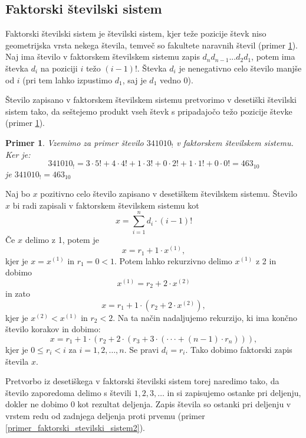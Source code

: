 \documentclass[a4paper, 12pt]{book}
\newtheorem{primer}{Primer}[chapter]
\begin{document}
\subsection{ Faktorski številski sistem }

Faktorski številski sistem je številski sistem, kjer teže pozicije števk niso geometrijska vrsta nekega števila, temveč so fakultete naravnih števil (primer \ref{primer_faktorski_stevilski_sistem1}). Naj ima število v faktorskem številskem sistemu zapis $d_nd_{n-1}...d_2d_1$, potem ima števka $d_i$ na poziciji $i$ težo $(i-1)!$. Števka $d_i$ je nenegativno celo število manjše od $i$ (pri tem lahko izpustimo $d_1$, saj je $d_1$ vedno $0$). 

Število zapisano v faktorskem številskem sistemu pretvorimo v desetiški številski sistem tako, da seštejemo produkt vseh števk s pripadajočo težo pozicije števke (primer \ref{primer_faktorski_stevilski_sistem1}).

\begin{primer}
\label{primer_faktorski_stevilski_sistem1}
    Vzemimo za primer število $341010_{!}$ v faktorskem številskem sistemu. Ker je:
    \[
        341010_{!} = 3 \cdot 5! + 4 \cdot 4! + 1 \cdot 3! + 0 \cdot 2! + 1 \cdot 1! + 0 \cdot 0! = 463_{10} 
    \]
    je $341010_{!} = 463_{10}$
\end{primer}

Naj bo $x$ pozitivno celo število zapisano v desetiškem številskem sistemu. Število $x$ bi radi zapisali v faktorskem številskem sistemu kot
\[
    x = \sum_{i=1}^{n} d_i \cdot (i-1)!
\]
Če $x$ delimo z 1, potem je 
\[
    x = r_1 + 1 \cdot x^{(1)},
\]
kjer je $x = x^{(1)}$ in $r_1 = 0 < 1$. Potem lahko rekurzivno delimo $x^{(1)}$ z 2 in dobimo
\[
    x^{(1)} = r_2 + 2 \cdot x^{(2)}
\]
in zato
\[
    x = r_1 + 1 \cdot (r_2 + 2 \cdot x^{(2)}),
\]
kjer je $x^{(2)} < x^{(1)}$ in $r_2 < 2$. Na ta način nadaljujemo rekurzijo, ki ima končno število korakov in dobimo:
\[
    x = r_1 + 1 \cdot (r_2 + 2 \cdot(r_3 + 3 \cdot(\cdot\cdot\cdot + (n-1) \cdot r_n))),
\]
kjer je $0 \leq r_i < i$ za $i = 1, 2, \dots, n$. Se pravi $d_i = r_i$. Tako dobimo faktorski zapis števila $x$.

Pretvorbo iz desetiškega v faktorski številski sistem torej naredimo tako, da število zaporedoma delimo s števili $1, 2, 3, \dots$ in si zapisujemo ostanke pri deljenju, dokler ne dobimo $0$ kot rezultat deljenja. Zapis števila so ostanki pri deljenju v vrstem redu od zadnjega deljenja proti prvemu (primer \ref{primer_faktorski_stevilski_sistem2}). 
\end{document}
